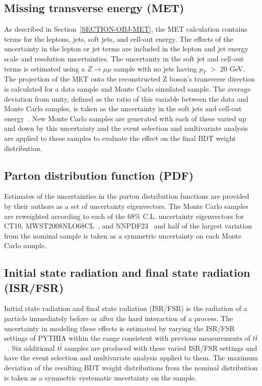 \subsection{Missing transverse energy (MET)}
\label{SECTION-RESULTS-SYSTEMATICS-MET}
As described in Section~\ref{SECTION-OBJ-MET}, the MET calculation contains terms for the leptons, jets, soft jets, and cell-out energy. The effects of the uncertainty in the lepton or jet terms are included in the lepton and jet energy scale and resolution uncertainties. The uncertainty in the soft jet and cell-out terms is estimated using a $Z \to \mu\mu$ sample with no jets having $p_T$ $>$ 20 GeV. The projection of the MET onto the reconstructed Z boson's transverse direction is calculated for a data sample and Monte Carlo simulated sample. The average deviation from unity, defined as the ratio of this variable between the data and Monte Carlo samples, is taken as the uncertainty in the soft jets and cell-out energy~\cite{MET}. New Monte Carlo samples are generated with each of these varied up and down by this uncertainty and the event selection and multivariate analysis are applied to these samples to evaluate the effect on the final BDT weight distribution.

\subsection{Parton distribution function (PDF)}
\label{SECTION-RESULTS-SYSTEMATICS-PDF}
Estimates of the uncertainties in the parton distribution functions are provided by their authors as a set of uncertainty eigenvectors. The Monte Carlo samples are reweighted according to each of the 68$\%$ C.L. uncertainty eigenvectors for CT10, MWST2008NLO68CL~\cite{MSTW2008}, and NNPDF23~\cite{NNPDF23} and half of the largest variation from the nominal sample is taken as a symmetric uncertainty on each Monte Carlo sample.

\subsection{Initial state radiation and final state radiation (ISR/FSR)}
\label{SECTION-RESULTS-SYSTEMATICS-ISRFSR}
Initial state radiation and final state radiation (ISR/FSR) is the radiation of a particle immediately before or after the hard interaction of a process. The uncertainty in modeling these effects is estimated by varying the ISR/FSR settings of PYTHIA within the range consistent with previous measurements of $t\bar{t}$~\cite{ISRFSR}. Six additional $t\bar{t}$ samples are produced with these varied ISR/FSR settings and have the event selection and multivariate analysis applied to them. The maximum deviation of the resulting BDT weight distributions from the nominal distribution is taken as a symmetric systematic uncertainty on the sample.

